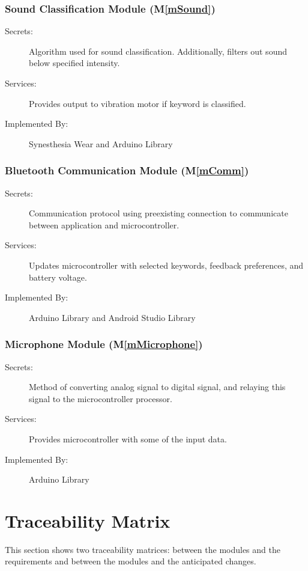 \documentclass[12pt, titlepage]{article}
\newcommand{\mref}[1]{M\ref{#1}}
\begin{document}
\subsubsection{Sound Classification Module (\mref{mSound})}
\begin{description}
  \item[Secrets:] Algorithm used for sound classification. Additionally, filters out sound below specified intensity.
  \item[Services:] Provides output to vibration motor if keyword is classified.
  \item[Implemented By:] Synesthesia Wear and Arduino Library
  \end{description}

\subsubsection{Bluetooth Communication Module (\mref{mComm})}
\begin{description}
  \item[Secrets:] Communication protocol using preexisting connection to communicate between application and microcontroller.
  \item[Services:] Updates microcontroller with selected keywords, feedback preferences, and battery voltage.
  \item[Implemented By:] Arduino Library and Android Studio Library
  \end{description}

\subsubsection{Microphone Module (\mref{mMicrophone})}
\begin{description}
  \item[Secrets:] Method of converting analog signal to digital signal, and relaying this signal to the microcontroller processor.
  \item[Services:] Provides microcontroller with some of the input data.
  \item[Implemented By:] Arduino Library
  \end{description}

\section{Traceability Matrix} \label{SecTM}

This section shows two traceability matrices: between the modules and the
requirements and between the modules and the anticipated changes.
\end{document}
